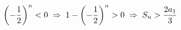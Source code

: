 \documentclass[preview]{standalone}
\begin{document}
\begin{align*}
\special{dvisvgm:raw <g id='unique000'>}\left(-\frac{1}{2}\right)^n<0 \;\Rightarrow\;  \special{dvisvgm:raw </g>}\special{dvisvgm:raw <g id='unique001'>}1-\left(-\frac{1}{2}\right)^n >0 \;\Rightarrow\; \special{dvisvgm:raw </g>}\special{dvisvgm:raw <g id='unique002'>}S_n>\frac{2a_1}{3}\special{dvisvgm:raw </g>}
\end{align*}
\end{document}
